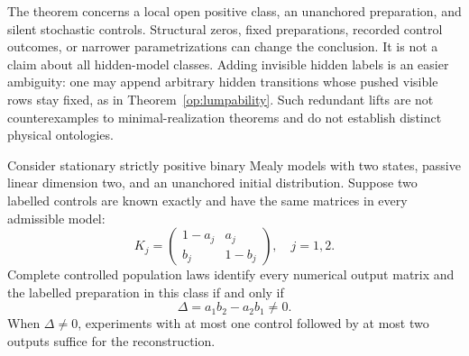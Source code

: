The theorem concerns a local open positive class, an unanchored
preparation, and silent stochastic controls.  Structural zeros, fixed
preparations, recorded control outcomes, or narrower parametrizations
can change the conclusion.  It is not a claim about all hidden-model
classes.  Adding invisible hidden labels is an easier ambiguity:
one may append arbitrary hidden transitions whose pushed visible rows
stay fixed, as in Theorem~\ref{op:lumpability}.  Such redundant lifts
are not counterexamples to minimal-realization theorems and do not
establish distinct physical ontologies.

\begin{theorem}
\label{op:two-controls}
Consider stationary strictly positive binary Mealy models with two
states, passive linear dimension two, and an unanchored initial
distribution.  Suppose two labelled controls are known exactly and
have the same matrices in every admissible model:
\[
 K_j=\begin{pmatrix}1-a_j&a_j\\b_j&1-b_j\end{pmatrix},\quad j=1,2 .
\]
Complete controlled population laws identify every numerical output
matrix and the labelled preparation in this class if and only if
\[
 \Delta=a_1b_2-a_2b_1\ne0 .
\]
When \(\Delta\ne0\), experiments with at most one control followed by
at most two outputs suffice for the reconstruction.
\end{theorem}
